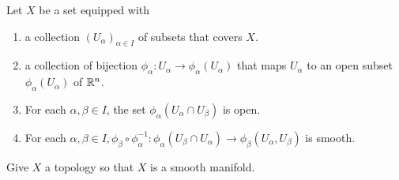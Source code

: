 \documentclass{report}
\begin{document}
\begin{question}{}{}
\label{othq}
Let $X$ be a set equipped with
\begin{enumerate}[label=(\alph*)]
  \item a collection $(U_\alpha )_{\alpha  \in I}$ of subsets that covers $X$. 
  \item a collection of bijection $\phi_\alpha  : U_\alpha \rightarrow \phi_\alpha (U_\alpha )$ that maps $U_\alpha $ to an open subset $\phi _\alpha (U_\alpha )$ of $\mathbb{R}^n$. 
  \item For each $\alpha ,\beta \in I $, the set $\phi_\alpha (U_\alpha \cap U_\beta )$ is open. 
  \item For each $\alpha ,\beta \in I, \phi_\beta \circ \phi_\alpha ^{-1}:\phi_\alpha (U_\beta  \cap U_\alpha )\rightarrow \phi_\beta (U_\alpha ,U_\beta )$ is smooth. 
\end{enumerate}
Give $X$ a topology so that  $X$ is a smooth manifold.
\end{question}
\end{document}
